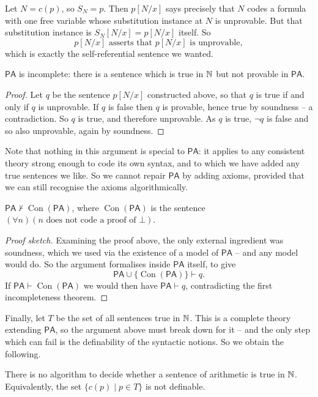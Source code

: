 \documentclass[a4paper]{scrartcl}
\newcommand{\PA}{\mathsf{PA}}
\newcommand{\Con}{\operatorname{Con}}
\begin{document}
Let $N = c(p)$, so $S_N = p$. Then $p[N/x]$ says precisely that $N$ codes a formula with one free variable whose substitution instance at $N$ is unprovable. But that substitution instance is $S_N[N/x] = p[N/x]$ itself. So
$$p[N/x] \text{ asserts that } p[N/x] \text{ is unprovable},$$
which is exactly the self-referential sentence we wanted.

\begin{theorem}
  $\PA$ is incomplete: there is a sentence which is true in $\mathbb{N}$ but not provable in $\PA$.
\end{theorem}
\begin{proof}
  Let $q$ be the sentence $p[N/x]$ constructed above, so that $q$ is true if and only if $q$ is unprovable. If $q$ is false then $q$ is provable, hence true by soundness -- a contradiction. So $q$ is true, and therefore unprovable. As $q$ is true, $\lnot q$ is false and so also unprovable, again by soundness.
\end{proof}

Note that nothing in this argument is special to $\PA$: it applies to any consistent theory strong enough to code its own syntax, and to which we have added any true sentences we like. So we cannot repair $\PA$ by adding axioms, provided that we can still recognise the axioms algorithmically.

\begin{theorem}
  $\PA \not\vdash \Con(\PA)$, where $\Con(\PA)$ is the sentence $(\forall n)(n \text{ does not code a proof of } \bot)$.
\end{theorem}
\begin{proof}[Proof sketch]
  Examining the proof above, the only external ingredient was soundness, which we used via the existence of a model of $\PA$ -- and any model would do. So the argument formalises inside $\PA$ itself, to give
  $$\PA \cup \{\Con(\PA)\} \vdash q.$$
  If $\PA \vdash \Con(\PA)$ we would then have $\PA \vdash q$, contradicting the first incompleteness theorem.
\end{proof}

Finally, let $T$ be the set of all sentences true in $\mathbb{N}$. This is a complete theory extending $\PA$, so the argument above must break down for it -- and the only step which can fail is the definability of the syntactic notions. So we obtain the following.

\begin{theorem}
  There is no algorithm to decide whether a sentence of arithmetic is true in $\mathbb{N}$. Equivalently, the set $\{c(p) \mid p \in T\}$ is not definable.
\end{theorem}
\end{document}
